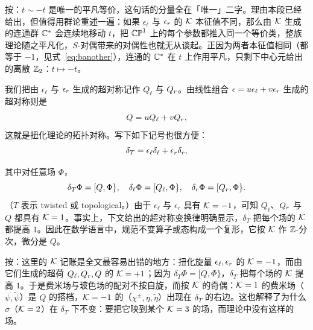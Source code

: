 \begin{yizhu}[易错点]
按：$t\sim-t$ 是唯一的平凡等价，这句话的分量全在「唯一」二字。理由本段已经给出，但值得用群论重述一遍：如果 $\epsilon_\ell$ 与 $\epsilon_\rr$ 的 ${\cal K}$ 本征值不同，那么由 ${\cal K}$ 生成的连通群 $\Bbb{C}^*$ 会连续地移动 $t$，把 $\Bbb{CP}^1$ 上的每个参数都推入同一个等价类，整族理论随之平凡化，$S$-对偶带来的对偶性也就无从谈起。正因为两者本征值相同（都等于 $-1$，见式~\eqref{eq:banother}），连通的 $\Bbb{C}^*$ 在 $t$ 上作用平凡，只剩下中心元给出的离散 $\Bbb{Z}_2$：$t\mapsto-t$。
\end{yizhu}

我们把由 $\epsilon_\ell$ 与 $\epsilon_\rr$ 生成的超对称记作 $Q_\ell$ 与 $Q_\rr$。由线性组合 $\epsilon=u\epsilon_\ell+v\epsilon_\rr$ 生成的超对称则是 %
\setcounter{equation}{14}
\begin{equation}\label{eq:hut}
Q=uQ_\ell+vQ_\rr,
\end{equation}
这就是扭化理论的拓扑对称。写下如下记号也很方便：
\setcounter{equation}{15}
\begin{equation}\label{eq:nut}
\delta_T=\epsilon_\ell\delta_\ell+\epsilon_\rr\delta_\rr,
\end{equation}

其中对任意场 $\Phi$，
\setcounter{equation}{16}
\begin{equation}\label{eq:but}
\delta_T\Phi=[Q,\Phi\},~~~\delta_\ell\Phi=
[Q_\ell,\Phi\},~~~\delta_\rr\Phi=[Q_\rr,\Phi\}.
\end{equation}
（$T$ 表示 twisted 或 topological。）由于 $\epsilon_\ell$ 与 $\epsilon_r$ 具有 ${\EUK}=-1$，可知 $Q_\ell$、$Q_\rr$ 与 $Q$ 都具有 ${\EUK}=1$。事实上，下文给出的超对称变换律明确显示，$\delta_T$ 把每个场的 ${\EUK}$ 都提高 $1$。因此在数学语言中，规范不变算子或态构成一个复形，它按 ${\EUK}$ 作 $\Bbb{Z}$-分次，微分是 $Q$。

\begin{yizhu}[易错点]
按：这里的 ${\EUK}$ 记账是全文最容易出错的地方：扭化旋量 $\epsilon_\ell,\epsilon_\rr$ 的 ${\EUK}=-1$，而由它们生成的超荷 $Q_\ell,Q_\rr,Q$ 的 ${\EUK}=+1$；因为 $\delta_T\Phi=[Q,\Phi\}$，$\delta_T$ 把每个场的 ${\EUK}$ 提高 $1$。于是费米场与玻色场的配对不按自旋，而按 ${\EUK}$ 的奇偶：${\EUK}=1$ 的费米场（$\psi,\tilde\psi$）是 $Q$ 的搭档，${\EUK}=-1$ 的（$\chi^\pm,\eta,\tilde\eta$）出现在 $\delta_T$ 的右边。这也解释了为什么 $\sigma$（${\EUK}=2$）在 $\delta_T$ 下不变：要把它映到某个 ${\EUK}=3$ 的场，而理论中没有这样的场。
\end{yizhu}

\par{}

